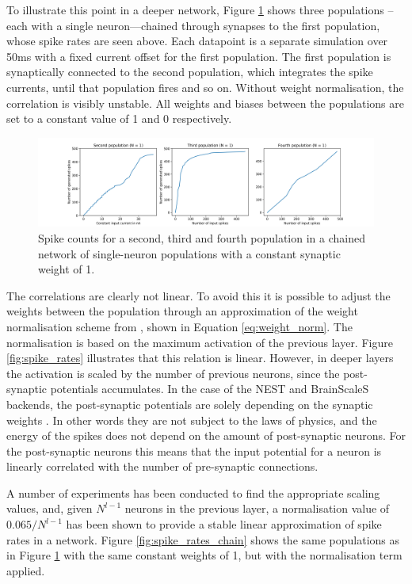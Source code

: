 To illustrate this point in a deeper network, Figure
\ref{fig:spike_rates_not_weighted} shows
three populations
--each with a single neuron---chained
through synapses to the first population, whose spike rates are seen above.
Each datapoint is a separate simulation over 50ms with a fixed
current offset for the first population.
The first population is synaptically connected to the second population, which 
integrates the spike currents, until that population fires and so on.
Without weight normalisation, the correlation is visibly unstable.
All weights and biases between the populations are set to a constant value of 1
and 0 respectively.

\begin{figure}
  \includegraphics[width=\linewidth]{images/spike_rate_not_weighted.png}
  \caption{Spike counts for a second, third and fourth population in a chained network of
  single-neuron populations with a constant synaptic weight of 1.}
  \label{fig:spike_rates_not_weighted}
\end{figure}

The correlations are clearly not linear.
To avoid this it is possible to adjust the weights between the population
through an approximation of
the weight normalisation scheme from \textcite{Rueckauer2017}, shown in Equation
\ref{eq:weight_norm}.
The normalisation is based on the maximum activation of the previous layer.
Figure \ref{fig:spike_rates} illustrates that this relation is linear.
However, in deeper layers the activation is scaled by the number of previous
neurons, since the post-synaptic potentials accumulates.
In the case of the NEST and BrainScaleS backends,
the post-synaptic potentials are solely depending on the synaptic weights
\cite{Gewaltig2007, Schmitt2017}.
In other words they are not subject to the laws of physics, and
the energy of the spikes does not depend on the amount of post-synaptic
neurons.
For the post-synaptic neurons this means that the input potential for a neuron
is linearly correlated with the number of pre-synaptic connections.

A number of experiments has been conducted to find the appropriate scaling values,
and, given $N^{l-1}$ neurons in the previous layer, a normalisation value of
$0.065 / N^{l-1}$
has been shown to provide a stable linear approximation of spike rates in a
network.
Figure \ref{fig:spike_rates_chain} shows the same populations as in 
Figure \ref{fig:spike_rates_not_weighted} with the same constant weights of 1, but with
the normalisation term applied.


